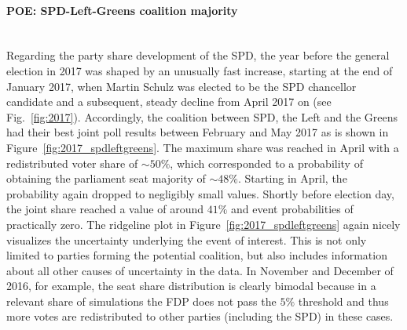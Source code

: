 \documentclass[smallcondensed]{svjour3}     %
\begin{document}
\paragraph{POE: SPD-Left-Greens coalition majority} \ \\
Regarding the party share development of the SPD, the year before
the general election in 2017 was shaped by an unusually fast increase, starting
at the end of January 2017, when Martin Schulz was elected to be the SPD chancellor
candidate and a subsequent, steady decline from April 2017 on (see Fig.~\ref{fig:2017}).
Accordingly, the coalition between SPD, the Left and the Greens had
their best joint poll results between February and May 2017 as is shown in
Figure~\ref{fig:2017_spdleftgreens}.
The maximum share was reached in April with a redistributed voter
share of $\sim 50\%$, which corresponded to a probability of obtaining the
parliament seat majority of $\sim 48\%$.
Starting in April, the probability again dropped to negligibly small values.
Shortly before election day, the joint share
reached a value of around $41\%$ and event probabilities of practically zero.
The ridgeline plot in Figure~\ref{fig:2017_spdleftgreens}
again nicely visualizes the uncertainty underlying the event of
interest. This is not only limited to parties forming the potential coalition,
but also includes information about all other causes of uncertainty in the data.
In November and December of 2016, for example, the seat share distribution
is clearly bimodal because in a relevant share of simulations the FDP does not
pass the $5\%$ threshold and thus more votes are redistributed to other parties
(including the SPD) in these cases.
\end{document}
